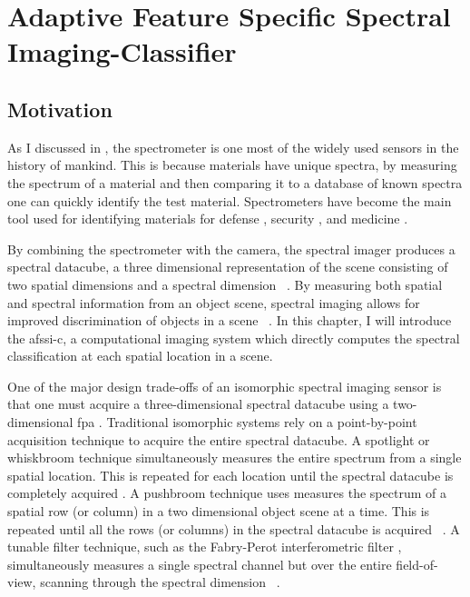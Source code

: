 \chapter{Adaptive Feature Specific Spectral Imaging-Classifier}\label{chap:Afssic}


\section{Motivation}

As I discussed in , the spectrometer is one most of the widely used sensors in the history of mankind. This is because materials have unique spectra, by measuring the spectrum of a material and then comparing it to a database of known spectra one can quickly identify the test material. Spectrometers have become the main tool used for identifying materials for defense \cite{sun2004detection, pearman2006classification}, security \cite{liu2006detection, liu2007terahertz}, and medicine \cite{maquelin2000raman, maquelin2002identification}. 

By combining the spectrometer with the camera, the spectral imager produces a spectral datacube, a three dimensional representation of the scene consisting of two spatial dimensions and a spectral dimension ~\cite{garini2006spectral,eismann2012hyperspectral}.  By measuring both spatial and spectral information from an object scene, spectral imaging allows for improved discrimination of objects in a scene ~\cite{chang2003hyperspectral, ibrahim2010spectral, shaw2003spectral}. In this chapter, I will introduce the \acrfull{afssi-c}, a computational imaging system which directly computes the spectral classification at each spatial location in a scene.

One of the major design trade-offs of an \gls{isomorphic} spectral imaging sensor is that one must acquire a three-dimensional spectral datacube using a two-dimensional \gls{fpa} \cite{garini2006spectral}. Traditional isomorphic systems rely on a point-by-point acquisition technique to acquire the entire spectral datacube. A spotlight or whiskbroom technique simultaneously measures the entire spectrum from a single spatial location. This is repeated for each location until the spectral datacube is completely acquired \cite{wolfe1997introduction}. A pushbroom technique uses measures the spectrum of a spatial row (or column) in a two dimensional object scene at a time. This is repeated until all the rows (or columns) in the spectral datacube is acquired ~\cite{yang2003ccd, wolfe1997introduction}. A tunable filter technique, such as the Fabry-Perot interferometric filter \cite{fabry1897franges, perot1899application, fabry1901new}, simultaneously measures a single spectral channel but over the entire field-of-view, scanning through the spectral dimension~\cite{gat2000imaging} . 

